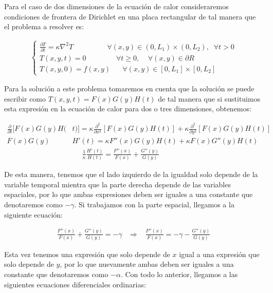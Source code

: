 \documentclass[12pt]{article}
\begin{document}
Para el caso de dos dimensiones de la ecuación de calor consideraremos condiciones de frontera de Dirichlet en una placa rectangular de tal manera que el problema a resolver es:

\begin{align}
    \begin{cases}
        \frac{\partial T}{\partial t} = \kappa \nabla^2T \;\;\;\;\;\;\;\;\;\;\;\;\;\;\;\;\; \forall (x,y)\in (0,L_1)\times(0,L_2), \;\; \forall t>0 \\
        T(x,y,t) = 0 \;\;\;\;\;\;\;\;\;\;\;\;\;\;\; \forall t \geq 0, \;\;\;\; \forall(x,y) \in \partial R \\
        T(x,y,0) = f(x,y) \;\;\;\;\;\; \forall (x,y)\in [0,L_1]\times[0,L_2]
    \end{cases}
\end{align}

Para la solución a este problema tomaremos en cuenta que la solución se puede escribir como $T(x,y,t) = F(x)G(y)H(t)$ de tal manera que si sustituimos esta expresión en la ecuación de calor para dos o tres dimensiones, obtenemos:

\begin{align*}
    \frac{\partial}{\partial t}[F(x)G(y)H(&t)] = \kappa\frac{\partial^2}{\partial x^2}[F(x)G(y)H(t)] + \kappa\frac{\partial^2}{\partial y^2}[F(x)G(y)H(t)] \\
    F(x)G(y)&H'(t) = \kappa F''(x)G(y)H(t) + \kappa F(x)G''(y)H(t) \\
    &\;\;\;\;\;\frac{1}{\kappa}\frac{H'(t)}{H(t)} = \frac{F''(x)}{F(x)} + \frac{G''(y)}{G(y)}
\end{align*}

De esta manera, tenemos que el lado izquierdo de la igualdad solo depende de la variable temporal mientra que la parte derecha depende de las variables espaciales, por lo que ambas expresiones deben ser iguales a una constante que denotaremos como $-\gamma$. Si trabajamos con la parte espacial, llegamos a la siguiente ecuación:

\begin{align*}
    \frac{F''(x)}{F(x)} + \frac{G''(y)}{G(y)} = -\gamma \;\;\; \Rightarrow \;\;\; \frac{F''(x)}{F(x)} = -\gamma - \frac{G''(y)}{G(y)}
\end{align*}

Esta vez tenemos una expresión que solo depende de $x$ igual a una expresión que solo depende de $y$, por lo que nuevamente ambas deben ser iguales a una constante que denotaremos como $-\alpha$. Con todo lo anterior, llegamos a las siguientes ecuaciones diferenciales ordinarias:
\end{document}
